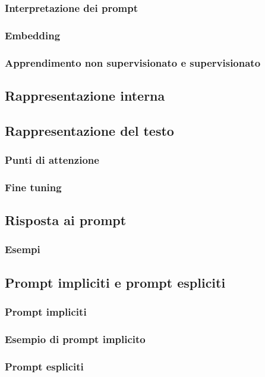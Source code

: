         \subsubsection{Interpretazione dei prompt}
        \subsubsection{Embedding}
        \subsubsection{Apprendimento non supervisionato e supervisionato}
    \subsection{Rappresentazione interna}
    \subsection{Rappresentazione del testo}
        \subsubsection{Punti di attenzione}
        \subsubsection{Fine tuning}
    \subsection{Risposta ai prompt}
        \subsubsection{Esempi}
    \subsection{Prompt impliciti e prompt espliciti}
        \subsubsection{Prompt impliciti}
        \subsubsection{Esempio di prompt implicito}
        \subsubsection{Prompt espliciti}
